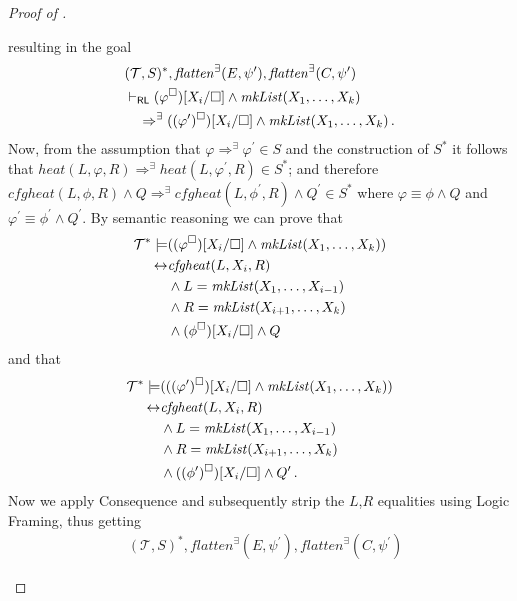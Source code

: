 \begin{proof}[Proof of ]
\begin{enumerate}
    resulting in the goal
    \begin{align*}
        & (\mathcal{T}, S)^*, \mathit{flatten}^\exists(E, \psi^\prime), \mathit{flatten}^\exists(C, \psi^\prime)
        \\& \vdash_{\mathsf{RL}}
        (\varphi^\square)[X_i/\square] \land
        \mathit{mkList}(X_1, \ldots, X_k)
        \\&\quad \Rightarrow^\exists
        ((\varphi^\prime)^\square)[X_i/\square] \land
        \mathit{mkList}(X_1, \ldots, X_k)
        \, .
    \end{align*}
    Now, from the assumption that $\varphi \Rightarrow^\exists \varphi^\prime \in S$ and the construction of $S^*$
    it follows that
    $\mathit{heat}(L, \varphi, R) \Rightarrow^\exists \mathit{heat}(L, \varphi^\prime, R) \in S^*$;
    and therefore
    $\mathit{cfgheat}(L, \phi, R) \land Q \Rightarrow^\exists \mathit{cfgheat}(L, \phi^\prime, R) \land Q^\prime \in S^*$
    where $\varphi \equiv \phi \land Q$ and $\varphi^\prime \equiv \phi^\prime \land Q^\prime$.
    By semantic reasoning we can prove that
    \begin{align*}
        \mathcal{T}^* \models & ((\varphi^\square)[X_i/\square] \land \mathit{mkList}(X_1, \ldots, X_k))
        \\ \leftrightarrow  &
        \mathit{cfgheat}(L, X_i, R)
        \\ & \land L = \mathit{mkList}(X_1, \ldots, X_{i-1})
        \\ & \land R = \mathit{mkList}(X_{i+1}, \ldots, X_k)
        \\ & \land (\phi^\square)[X_i/\square] \land Q
    \end{align*}
    and that
    \begin{align*}
        \mathcal{T}^* \models & (((\varphi^\prime)^\square)[X_i/\square] \land \mathit{mkList}(X_1, \ldots, X_k))
        \\ \leftrightarrow  &
        \mathit{cfgheat}(L, X_i, R)
        \\ & \land L = \mathit{mkList}(X_1, \ldots, X_{i-1})
        \\ & \land R = \mathit{mkList}(X_{i+1}, \ldots, X_k)
        \\ & \land ((\phi^\prime)^\square)[X_i/\square] \land Q^\prime \, .
    \end{align*}
    Now we apply Consequence and subsequently strip the $L$,$R$ equalities using Logic Framing, thus getting
    \begin{align*}
        & (\mathcal{T}, S)^*, \mathit{flatten}^\exists(E, \psi^\prime), \mathit{flatten}^\exists(C, \psi^\prime)

\end{align*}
\end{enumerate}
\end{proof}
